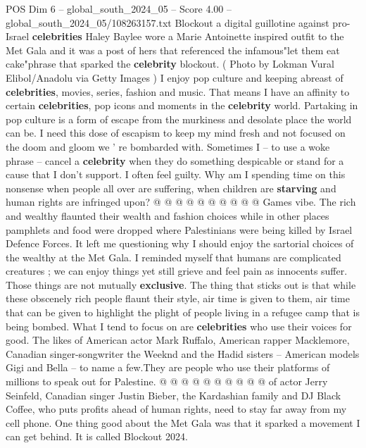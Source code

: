 \begin{textsample}{POS Dim 6 – global\_south\_2024\_05 – Score 4.00 – global\_south\_2024\_05/108263157.txt}  \label{ex:f6_pos_216}
Blockout a digital guillotine against pro-Israel \textbf{celebrities} Haley Baylee wore a Marie Antoinette inspired outfit to the Met Gala and it was a post of hers that referenced the infamous"let them eat cake"phrase that sparked the \textbf{celebrity} blockout. ( Photo by Lokman Vural Elibol/Anadolu via Getty Images ) I enjoy pop culture and keeping abreast of \textbf{celebrities}, movies, series, fashion and music.
That means I have an affinity to certain \textbf{celebrities}, pop icons and moments in the \textbf{celebrity} world.
Partaking in pop culture is a form of escape from the murkiness and desolate place the world can be.
I need this dose of escapism to keep my mind fresh and not focused on the doom and gloom we ' re bombarded with.
Sometimes I -- to use a woke phrase -- cancel a \textbf{celebrity} when they do something despicable or stand for a cause that I don't support.
I often feel guilty.
Why am I spending time on this nonsense when people all over are suffering, when children are \textbf{starving} and human rights are infringed upon? @ @ @ @ @ @ @ @ @ @ Games vibe.
The rich and wealthy flaunted their wealth and fashion choices while in other places pamphlets and food were dropped where Palestinians were being killed by Israel Defence Forces.
It left me questioning why I should enjoy the sartorial choices of the wealthy at the Met Gala.
I reminded myself that humans are complicated creatures ; we can enjoy things yet still grieve and feel pain as innocents suffer.
Those things are not mutually \textbf{exclusive}.
The thing that sticks out is that while these obscenely rich people flaunt their style, air time is given to them, air time that can be given to highlight the plight of people living in a refugee camp that is being bombed.
What I tend to focus on are \textbf{celebrities} who use their voices for good.
The likes of American actor Mark Ruffalo, American rapper Macklemore, Canadian singer-songwriter the Weeknd and the Hadid sisters -- American models Gigi and Bella -- to name a few.They are people who use their platforms of millions to speak out for Palestine. @ @ @ @ @ @ @ @ @ @ of actor Jerry Seinfeld, Canadian singer Justin Bieber, the Kardashian family and DJ Black Coffee, who puts profits ahead of human rights, need to stay far away from my cell phone.
One thing good about the Met Gala was that it sparked a movement I can get behind.
It is called Blockout 2024.

\end{textsample}
